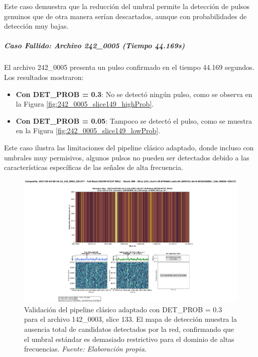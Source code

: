 Este caso demuestra que la reducción del umbral permite la detección de pulsos genuinos que de otra manera serían descartados, aunque con probabilidades de detección muy bajas.

\subparagraph{Caso Fallido: Archivo 242\_0005 (Tiempo 44.169s)}

El archivo 242\_0005 presenta un pulso confirmado en el tiempo 44.169 segundos. Los resultados mostraron:

\begin{itemize}
    \item \textbf{Con DET\_PROB = 0.3}: No se detectó ningún pulso, como se observa en la Figura \ref{fig:242_0005_slice149_highProb}.
    \item \textbf{Con DET\_PROB = 0.05}: Tampoco se detectó el pulso, como se muestra en la Figura \ref{fig:242_0005_slice149_lowProb}.
\end{itemize}

Este caso ilustra las limitaciones del pipeline clásico adaptado, donde incluso con umbrales muy permisivos, algunos pulsos no pueden ser detectados debido a las características específicas de las señales de alta frecuencia.

\begin{figure}[H]
    \centering
    \includegraphics[width=\textwidth]{figures/2017-04-03-08-16-13_142_0003_t39.977_slice133.png}
    \caption[ALMA 142\_0003: DET\_PROB 0.3]{Validación del pipeline clásico adaptado con DET\_PROB = 0.3 para el archivo 142\_0003, slice 133. El mapa de detección muestra la ausencia total de candidatos detectados por la red, confirmando que el umbral estándar es demasiado restrictivo para el dominio de altas frecuencias. \textit{Fuente: Elaboración propia}.}
    \label{fig:142_0003_slice133_highProb}
\end{figure}

